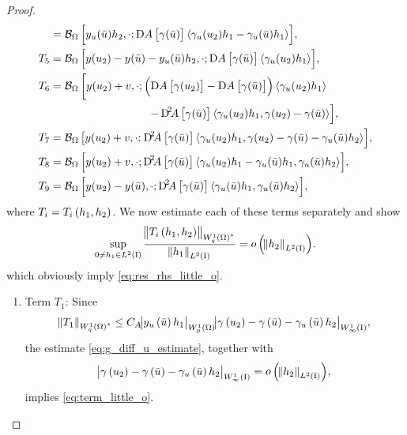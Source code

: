 \documentclass[final]{siamltex}
\begin{document}
\begin{proof}
\begin{align*}
			&= {{{\mathcal{B}}_\Omega}\sbr{y_u({\bar{u}})h_2,\cdot;
					\Dif A\sbr{\gamma({\bar{u}})}{\langle {\gamma_u(u_2)h_1 
												    - \gamma_u({\bar{u}})h_1} \rangle} }}, \\
		T_5 
			&= {{{\mathcal{B}}_\Omega}\sbr{y(u_2)-y({\bar{u}})-y_u({\bar{u}})h_2,\cdot;
			\Dif A\sbr{\gamma({\bar{u}})}{\langle {\gamma_u(u_2)h_1} \rangle} }}, \\
		T_6 
			&= {{{\mathcal{B}}_\Omega}\left[{y(u_2)+v,\cdot; 
					\del{\Dif A\sbr{\gamma(u_2)}-\Dif A\sbr{\gamma({\bar{u}})}}{\langle {\gamma_u(u_2)h_1 } \rangle}
				}\right.} \\ &\qquad\qquad\qquad\qquad\quad {\left.{
					-\Dif^2 \!\!  A\sbr{\gamma({\bar{u}})}{\langle {\gamma_u(u_2)h_1, \gamma(u_2)-\gamma({\bar{u}})} \rangle} 
				}\right]}, \\
		T_7
			&= {{{\mathcal{B}}_\Omega}\left[{y(u_2)+v,\cdot;
				}\right.} {\left.{
				\Dif^2 \!\!  A\sbr{\gamma({\bar{u}})}{\langle {\gamma_u(u_2)h_1, 
									    \gamma(u_2)-\gamma({\bar{u}}) - \gamma_u({\bar{u}})h_2} \rangle} 
				}\right]}, \\
		T_8 
			&= {{{\mathcal{B}}_\Omega}\sbr{y(u_2)+v,\cdot;
			\Dif^2 \!\!  A\sbr{\gamma({\bar{u}})}{\langle {\gamma_u(u_2)h_1-\gamma_u({\bar{u}})h_1, \gamma_u({\bar{u}})h_2} \rangle} }}, \\
		T_9 
			&= {{{\mathcal{B}}_\Omega}\sbr{y(u_2)-y({\bar{u}}),\cdot;
			\Dif^2 \!\!  A\sbr{\gamma({\bar{u}})}{\langle {\gamma_u({\bar{u}})h_1, \gamma_u({\bar{u}})h_2} \rangle} }} ,
	\end{align*}
	where $T_i = T_i\del{h_1,h_2}$. 
We now estimate each of these terms separately and show 
	\begin{align}\label{eq:term_little_o}
		\sup_{0\neq h_1 \in L^2({\text{\rm I}})} \frac{{\norm{{T_i\del{h_1,h_2}}}_{{{W^{{1}}_{{q}}\del{{\Omega}}}}^*}}}{{\norm{{h_1}}_{{L^2\del{{{\text{\rm I}}}}}}}} = {\mathop{o}\del{{{{\norm{{h_2}}_{{L^2\del{{{\text{\rm I}}}}}}}}}}}.
	\end{align}
which obviously imply \eqref{eq:res_rhs_little_o}.

\begin{enumerate}[$\bullet$]
	\item Term $T_1$: Since 
		\[
			{\norm{{T_1}}_{{{W^{{1}}_{{q}}\del{{\Omega}}}}^*}}
			\leq C_A{\abs{{y_u\del{\bar{u}} h_1}}_{{W^{{1}}_{{p}}\del{{\Omega}}}}} 
				{\abs{{{\gamma\del{u_2} - \gamma\del{\bar{u}} - \gamma_u\del{\bar{u}} h_2}}}_{{W^{{1}}_{{\infty}}\del{{\text{\rm I}}}}}},
		\]
	the estimate \eqref{eq:g_diff_u_estimate}, together with 
		\[
			{\abs{{\gamma\del{u_2} - \gamma\del{\bar{u}} - \gamma_u\del{\bar{u}} h_2}}_{{W^{{{1}}}_{{{\infty}}}\del{{\text{\rm I}}}}}} = {\mathop{o}\del{{{{\norm{{h_2}}_{{L^2\del{{{\text{\rm I}}}}}}}}}}},
		\]
	implies \eqref{eq:term_little_o}.
	

\end{enumerate}
\end{proof}
\end{document}
